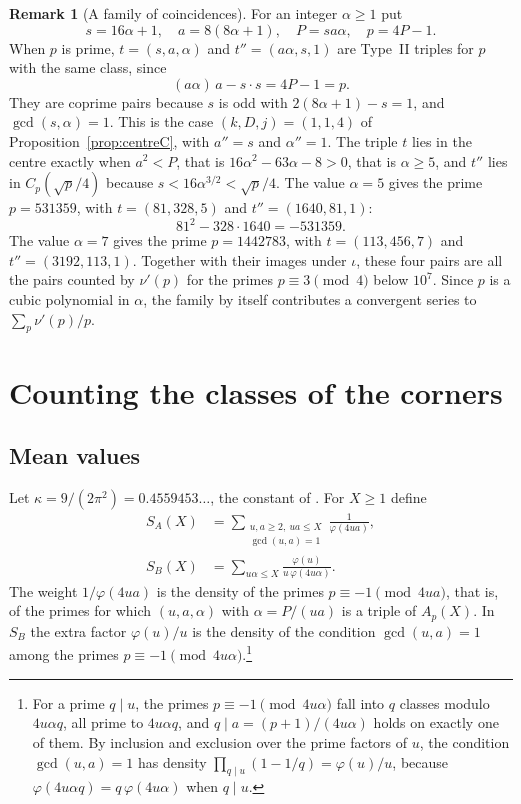 \documentclass[aps,prd,twocolumn,superscriptaddress,nofootinbib,longbibliography,floatfix,showkeys,nobalancelastpage,amsmath,amssymb,10pt]{revtex4-2}
\theoremstyle{plain}
\theoremstyle{definition}
\newtheorem{remark}[theorem]{Remark}
\theoremstyle{plain}
\begin{document}
\begin{remark}[A family of coincidences]\label{rem:family}
For an integer $\alpha\ge1$ put
\[
s=16\alpha+1,\quad a=8(8\alpha+1),\quad P=sa\alpha,\quad p=4P-1.
\]
When $p$ is prime, $t=(s,a,\alpha)$ and $t''=(a\alpha,s,1)$ are Type~II triples for $p$ with the same class, since
\[
(a\alpha)\,a-s\cdot s=4P-1=p.
\]
They are coprime pairs because $s$ is odd with $2(8\alpha+1)-s=1$, and $\gcd(s,\alpha)=1$. This is the case $(k,D,j)=(1,1,4)$ of Proposition~\ref{prop:centreC}, with $a''=s$ and $\alpha''=1$. The triple $t$ lies in the centre exactly when $a^2<P$, that is $16\alpha^2-63\alpha-8>0$, that is $\alpha\ge5$, and $t''$ lies in $C_p(\sqrt p/4)$ because $s<16\alpha^{3/2}<\sqrt p/4$. The value $\alpha=5$ gives the prime $p=531359$, with $t=(81,328,5)$ and $t''=(1640,81,1)$:
\[
81^2-328\cdot1640=-531359.
\]
The value $\alpha=7$ gives the prime $p=1442783$, with $t=(113,456,7)$ and $t''=(3192,113,1)$. Together with their images under $\iota$, these four pairs are all the pairs counted by $\nu'(p)$ for the primes $p\equiv3\pmod4$ below $10^7$. Since $p$ is a cubic polynomial in $\alpha$, the family by itself contributes a convergent series to $\sum_p\nu'(p)/p$.
\end{remark}

\section{Counting the classes of the corners}\label{sec:counting}

\subsection{Mean values}

Let $\kappa=9/(2\pi^2)=0.4559453\ldots$, the constant of \cite{Liu,BBv1}. For $X\ge1$ define
\begin{align*}
S_A(X)&=\sum_{\substack{u,a\ge2,\ ua\le X\\ \gcd(u,a)=1}}\frac1{\varphi(4ua)},\\
S_B(X)&=\sum_{u\alpha\le X}\frac{\varphi(u)}{u\,\varphi(4u\alpha)}.
\end{align*}
The weight $1/\varphi(4ua)$ is the density of the primes $p\equiv-1\pmod{4ua}$, that is, of the primes for which $(u,a,\alpha)$ with $\alpha=P/(ua)$ is a triple of $A_p(X)$. In $S_B$ the extra factor $\varphi(u)/u$ is the density of the condition $\gcd(u,a)=1$ among the primes $p\equiv-1\pmod{4u\alpha}$.\footnote{For a prime $q\mid u$, the primes $p\equiv-1\pmod{4u\alpha}$ fall into $q$ classes modulo $4u\alpha q$, all prime to $4u\alpha q$, and $q\mid a=(p+1)/(4u\alpha)$ holds on exactly one of them. By inclusion and exclusion over the prime factors of $u$, the condition $\gcd(u,a)=1$ has density $\prod_{q\mid u}(1-1/q)=\varphi(u)/u$, because $\varphi(4u\alpha q)=q\,\varphi(4u\alpha)$ when $q\mid u$.}
\end{document}
